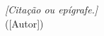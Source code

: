 %

\begin{epigrafe}
    \vspace*{\fill}
    \begin{flushright}
        \textit{[Citação ou epígrafe.]}\\
        ([Autor])
    \end{flushright}
\end{epigrafe}
